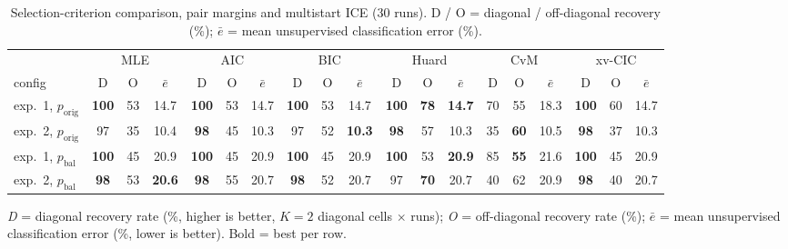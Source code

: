 \begin{table}[htbp]
  \centering
  \caption{Selection-criterion comparison, pair margins and multistart ICE (30 runs). D / O = diagonal / off-diagonal recovery (\%); $\bar{e}$ = mean unsupervised classification error (\%).}
  \label{tab:exp4-multi}
  \footnotesize
  \begin{tabular}{l ccc ccc ccc ccc ccc ccc }
    \toprule
    & \multicolumn{3}{c}{MLE} & \multicolumn{3}{c}{AIC} & \multicolumn{3}{c}{BIC} & \multicolumn{3}{c}{Huard} & \multicolumn{3}{c}{CvM} & \multicolumn{3}{c}{xv-CIC} \\
    \cmidrule(lr){2-4}\cmidrule(lr){5-7}\cmidrule(lr){8-10}\cmidrule(lr){11-13}\cmidrule(lr){14-16}\cmidrule(lr){17-19}
    config  & D & O & $\bar{e}$ & D & O & $\bar{e}$ & D & O & $\bar{e}$ & D & O & $\bar{e}$ & D & O & $\bar{e}$ & D & O & $\bar{e}$ \\
    \midrule
    exp.\ 1, $p_{\text{orig}}$ & \textbf{100} & 53 & 14.7 & \textbf{100} & 53 & 14.7 & \textbf{100} & 53 & 14.7 & \textbf{100} & \textbf{78} & \textbf{14.7} & 70 & 55 & 18.3 & \textbf{100} & 60 & 14.7 \\
    exp.\ 2, $p_{\text{orig}}$ & 97 & 35 & 10.4 & \textbf{98} & 45 & 10.3 & 97 & 52 & \textbf{10.3} & \textbf{98} & 57 & 10.3 & 35 & \textbf{60} & 10.5 & \textbf{98} & 37 & 10.3 \\
    exp.\ 1, $p_{\text{bal}}$ & \textbf{100} & 45 & 20.9 & \textbf{100} & 45 & 20.9 & \textbf{100} & 45 & 20.9 & \textbf{100} & 53 & \textbf{20.9} & 85 & \textbf{55} & 21.6 & \textbf{100} & 45 & 20.9 \\
    exp.\ 2, $p_{\text{bal}}$ & \textbf{98} & 53 & \textbf{20.6} & \textbf{98} & 55 & 20.7 & \textbf{98} & 52 & 20.7 & 97 & \textbf{70} & 20.7 & 40 & 62 & 20.9 & \textbf{98} & 40 & 20.7 \\
    \bottomrule
  \end{tabular}
  \par\smallskip
  \emph{D} = diagonal recovery rate (\%, higher is better, $K{=}2$ diagonal cells $\times$ runs); \emph{O} = off-diagonal recovery rate (\%); $\bar{e}$ = mean unsupervised classification error (\%, lower is better). Bold = best per row.
\end{table}
